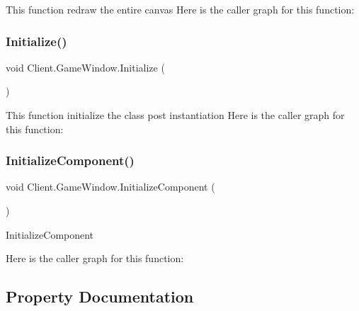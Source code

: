 This function redraw the entire canvas Here is the caller graph for this function\+:
\mbox{\label{class_client_1_1_game_window_a1fc43a939c13e466c4f9d031cab17d21}} 
\subsubsection{\texorpdfstring{Initialize()}{Initialize()}}
{\footnotesize\ttfamily void Client.\+Game\+Window.\+Initialize (\begin{DoxyParamCaption}{ }\end{DoxyParamCaption})\hspace{0.3cm}{\ttfamily [inline]}}

This function initialize the class post instantiation Here is the caller graph for this function\+:
\mbox{\label{class_client_1_1_game_window_a22d0fc5b8dc7a9e2a25e68ac5a3655fd}} 
\subsubsection{\texorpdfstring{Initialize\+Component()}{InitializeComponent()}}
{\footnotesize\ttfamily void Client.\+Game\+Window.\+Initialize\+Component (\begin{DoxyParamCaption}{ }\end{DoxyParamCaption})\hspace{0.3cm}{\ttfamily [inline]}}



Initialize\+Component 

Here is the caller graph for this function\+:


\subsection{Property Documentation}
\mbox{\label{class_client_1_1_game_window_acc8143b52bf52de1b9fbdb2bd21e1cb1}} 
